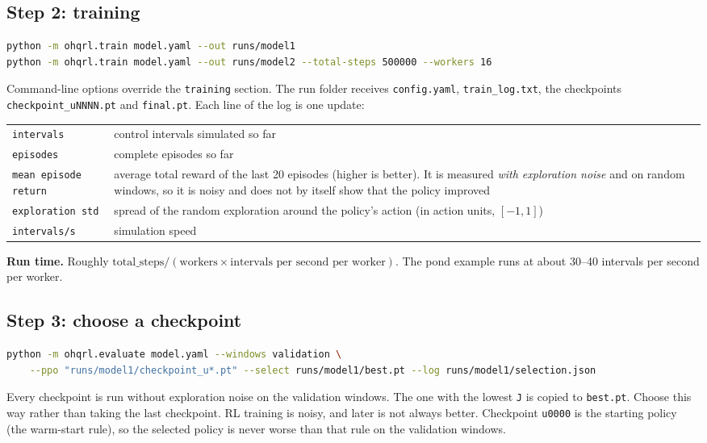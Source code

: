 \documentclass[11pt]{article}
\newcommand{\code}[1]{\texttt{#1}}
\begin{document}
\subsection{Step 2: training}
\begin{lstlisting}[language=bash]
python -m ohqrl.train model.yaml --out runs/model1
python -m ohqrl.train model.yaml --out runs/model2 --total-steps 500000 --workers 16
\end{lstlisting}
Command-line options override the \code{training} section. The run folder
receives \code{config.yaml}, \code{train\_log.txt}, the checkpoints
\code{checkpoint\_uNNNN.pt} and \code{final.pt}. Each line of the log is one
update:
\begin{center}\small
\begin{tabular}{@{}lp{10.5cm}@{}}
\toprule
\code{intervals} & control intervals simulated so far\\
\code{episodes} & complete episodes so far\\
\code{mean episode return} & average total reward of the last 20 episodes (higher is better). It is measured \emph{with exploration noise} and on random windows, so it is noisy and does not by itself show that the policy improved\\
\code{exploration std} & spread of the random exploration around the policy's action (in action units, $[-1,1]$)\\
\code{intervals/s} & simulation speed\\
\bottomrule
\end{tabular}
\end{center}
\textbf{Run time.} Roughly
$\text{total\_steps} / (\text{workers}\times\text{intervals per second per worker})$.
The pond example runs at about 30--40 intervals per second per worker.

\subsection{Step 3: choose a checkpoint}
\begin{lstlisting}[language=bash]
python -m ohqrl.evaluate model.yaml --windows validation \
    --ppo "runs/model1/checkpoint_u*.pt" --select runs/model1/best.pt --log runs/model1/selection.json
\end{lstlisting}
Every checkpoint is run without exploration noise on the validation
windows. The one with the lowest \code{J} is copied to \code{best.pt}.
Choose this way rather than taking the last checkpoint. RL training is
noisy, and later is not always better. Checkpoint \code{u0000} is the
starting policy (the warm-start rule), so the selected policy is never
worse than that rule on the validation windows.
\end{document}
